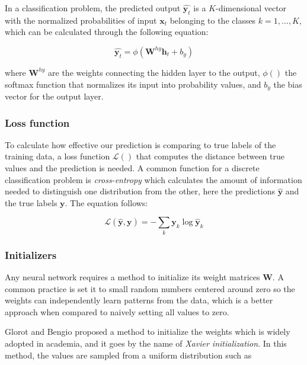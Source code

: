 \documentclass{kththesis}
\begin{document}
In a classification problem, the predicted output $\hat{\mathbf{y}_t}$ is a $K$-dimensional vector with the normalized probabilities of input $\mathbf{x}_t$ belonging to the classes $k=1,...,K$, which can be calculated through the following equation:

\begin{equation}
\hat{\mathbf{y}_t} = \phi(\mathbf{W}^{hy}\mathbf{h}_t + b_y)
\end{equation}

where $\mathbf{W}^{hy}$ are the weights connecting the hidden layer to the output, $\phi()$ the softmax function that normalizes its input into probability values, and $b_y$ the bias vector for the output layer. 

\subsubsection{Loss function}

To calculate how effective our prediction is comparing to true labels of the training data, a loss function $\mathcal{L}()$ that computes the distance between true values and the prediction is needed. A common function for a discrete classification problem is \emph{cross-entropy} which calculates the amount of information needed to distinguish one distribution from the other\citep{buja2005loss}, here the predictions $\hat{\mathbf{y}}$ and the true labels $\mathbf{y}$. The equation follows:

\begin{equation}
\mathcal{L}(\hat{\mathbf{y}}, \mathbf{y}) = - \sum_k \mathbf{y}_k \log \hat{\mathbf{y}}_k
\end{equation}

\subsubsection{Initializers}

Any neural network requires a method to initialize its weight matrices $\mathbf{W}$. A common practice is set it to small random numbers centered around zero so the weights can independently learn patterns from the data, which is a better approach when compared to naively setting all values to zero. 

Glorot and Bengio\citep{glorot2010understanding} proposed a method to initialize the weights which is widely adopted in academia, and it goes by the name of \emph{Xavier initialization}. In this method, the values are sampled from a uniform distribution such as
\end{document}
